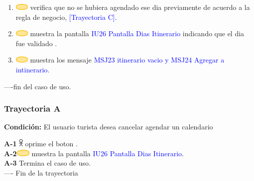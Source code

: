 \begin{enumerate}
\item \includegraphics[width=0.0500\textwidth]{Figuras/sistema.png} verifica que no se hubiera agendado ese dia previamente de acuerdo a la regla de negocio, \textcolor{blue}{[Trayectoria C].}

\item \includegraphics[width=0.0500\textwidth]{Figuras/sistema.png} muestra la pantalla \textcolor{blue}{IU26 Pantalla Dias Itinerario} indicando que el dia fue validado .

\item \includegraphics[width=0.0500\textwidth]{Figuras/sistema.png} muestra los mensaje \textcolor{blue}{MSJ23 itinerario vacio y MSJ24 Agregar a intinerario}.

\end{enumerate}
----fin del caso de uso. \\

\subsubsection{\textbf{Trayectoria A}}

\textbf{Condición:} El usuario turista desea cancelar agendar un calendario \par

     \textbf{A-1} \includegraphics[width=0.0150\textwidth]{Figuras/persona.png} oprime el boton . \\
    \textbf{A-2}\includegraphics[width=0.0500\textwidth]{Figuras/sistema.png} muestra la pantalla \textcolor{blue}{IU26 Pantalla Dias Itinerario}. \\
   \textbf{A-3} Termina el caso de uso. \\
   ---- Fin de la trayectoria\par


